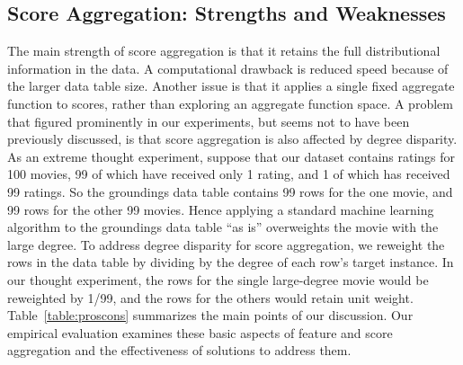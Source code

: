 \documentclass[conference]{IEEEtran}
\begin{document}
\subsection{Score Aggregation: Strengths and Weaknesses} The main strength of score aggregation is that it retains the full distributional information in the data. A computational drawback is reduced speed because of the larger data table size. Another issue is that it applies a single fixed aggregate function to scores, rather than exploring an aggregate function space. A problem that figured prominently in our experiments, but seems not to have been previously discussed, is that score aggregation is also affected by degree disparity. As an extreme thought experiment, suppose that our dataset contains ratings for 100 movies, 99 of which have received only 1 rating, and 1 of which has received 99 ratings. So the groundings data table contains 99 rows for the one movie, and 99 rows for the other 99 movies. Hence applying a standard machine learning algorithm to the groundings data table ``as is'' overweights the movie with the large degree. To address degree disparity for score aggregation, we reweight the rows in the data table by dividing by the degree of each row's target instance. In our thought experiment, the rows for the single large-degree movie would be reweighted by 1/99, and the rows for the others would retain unit weight. Table~\ref{table:proscons} summarizes the main points of our discussion. 
Our empirical evaluation examines these basic aspects of feature and score aggregation and the effectiveness of solutions to address them.

\begin{table}[htbp]
\caption{Conceptual Comparison of Feature vs. Score Aggregation}
\centering
{}
\label{table:proscons}
\end{table}
\end{document}
